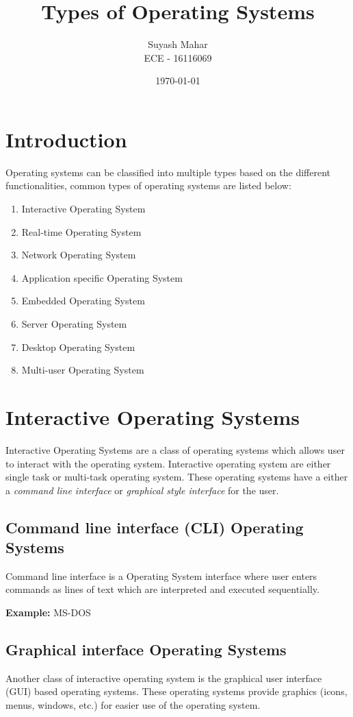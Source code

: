 \documentclass[a4,11pt]{article}
\title{Types of Operating Systems}
\author{Suyash Mahar \\
            ECE - 16116069
}
\date{\today}
\begin{document}
\maketitle

\begin{multicols}{2}
  
  \section{Introduction}
  Operating systems can be classified into multiple types based on the
  different functionalities, common types of operating systems are
  listed below:
  \begin{enumerate}
  \item Interactive Operating System
  \item Real-time Operating System
  \item Network Operating System
  \item Application specific Operating System
  \item Embedded Operating System
  \item Server Operating System
  \item Desktop Operating System
  \item Multi-user Operating System
  \end{enumerate}
  \section{Interactive Operating Systems}
  Interactive Operating Systems are a class of operating systems which
  allows user to interact with the operating system. Interactive
  operating system are either single task or multi-task operating
  system. These operating systems have a either a \textit{command line
    interface} or \textit{graphical style interface} for the user.
  \subsection{Command line interface (CLI) Operating Systems}
  Command line interface is a Operating System interface where user
  enters commands as lines of text which are interpreted and executed
  sequentially.

  \textbf{Example:} MS-DOS

  \subsection{Graphical interface Operating Systems}
  Another class of interactive operating system is the graphical user
  interface (GUI) based operating systems. These operating systems
  provide graphics (icons, menus, windows, etc.) for easier use of the
  operating system.


\end{multicols}
\end{document}
